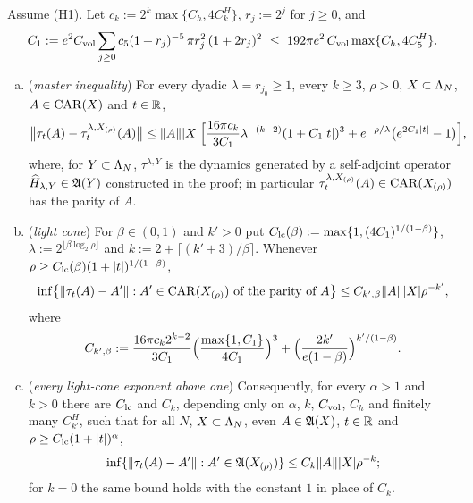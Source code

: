 \begin{theorem}\label{thm:propagation}
Assume (H1). Let $c_k:=2^k\max\{C_h,4C^H_k\}$, $r_j:=2^j$ for $j\ge0$, and
\[
C_1:=e^2C_{\mathrm{vol}}\sum_{j\ge0}c_5(1+r_j)^{-5}\,\pi r_j^2\,(1+2r_j)^2\ \le\ 192\pi e^2\,C_{\mathrm{vol}}\max\{C_h,4C^H_5\}.
\]
\begin{enumerate}[(a)]
\item (\emph{master inequality}) For every dyadic $\lambda=r_{j_0}\ge1$, every $k\ge3$, $\rho>0$, $X\subset\Lambda_N$,
$A\in\mathrm{CAR}(X)$ and $t\in\mathbb{R}$,
\[
\bigl\lVert\tau_t(A)-\tau^{\lambda,X_{(\rho)}}_t(A)\bigr\rVert\le\lVert A\rVert\lvert X\rvert\Bigl[\frac{16\pi c_k}{3C_1}\lambda^{-(k-2)}
(1+C_1\lvert t\rvert)^3+e^{-\rho/\lambda}\bigl(e^{2C_1\lvert t\rvert}-1\bigr)\Bigr],
\]
where, for $Y\subset\Lambda_N$, $\tau^{\lambda,Y}$ is the dynamics generated by a self-adjoint operator
$\widehat{H}_{\lambda,Y}\in\mathfrak{A}(Y)$ constructed in the proof; in particular $\tau^{\lambda,X_{(\rho)}}_t(A)\in\mathrm{CAR}(X_{(\rho)})$
has the parity of $A$.
\item (\emph{light cone}) For $\beta\in(0,1)$ and $k'>0$ put $C_{\rm lc}(\beta):=\max\{1,(4C_1)^{1/(1-\beta)}\}$,
$\lambda:=2^{\lfloor\beta\log_2\rho\rfloor}$ and $k:=2+\lceil(k'+3)/\beta\rceil$. Whenever
$\rho\ge C_{\rm lc}(\beta)(1+\lvert t\rvert)^{1/(1-\beta)}$,
\[
\inf\bigl\{\lVert\tau_t(A)-A'\rVert:A'\in\mathrm{CAR}(X_{(\rho)})\text{ of the parity of }A\bigr\}\le C_{k',\beta}\lVert A\rVert\lvert X\rvert\rho^{-k'},
\]
where
\[
C_{k',\beta}:=\frac{16\pi c_k2^{k-2}}{3C_1}\Bigl(\frac{\max\{1,C_1\}}{4C_1}\Bigr)^3+\Bigl(\frac{2k'}{e(1-\beta)}\Bigr)^{k'/(1-\beta)}.
\]
\item (\emph{every light-cone exponent above one}) Consequently, for every $\alpha>1$ and $k>0$ there are
$C_{\rm lc}$ and $C_k$, depending only on $\alpha$, $k$, $C_{\mathrm{vol}}$, $C_h$ and finitely many $C^H_{k'}$, such that for all
$N$, $X\subset\Lambda_N$, even $A\in\mathfrak{A}(X)$, $t\in\mathbb{R}$ and $\rho\ge C_{\rm lc}(1+\lvert t\rvert)^\alpha$,
\[
\inf\{\lVert\tau_t(A)-A'\rVert:A'\in\mathfrak{A}(X_{(\rho)})\}\le C_k\lVert A\rVert\lvert X\rvert\rho^{-k};
\]
for $k=0$ the same bound holds with the constant $1$ in place of $C_k$.
\end{enumerate}
\end{theorem}

